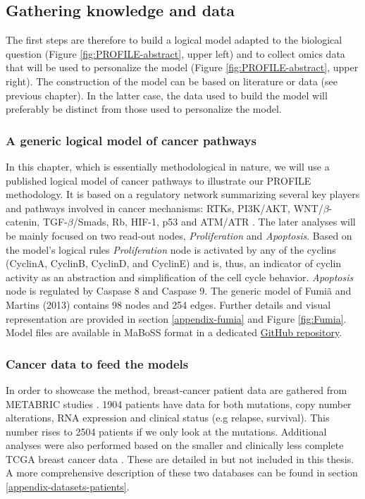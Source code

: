 \documentclass[a4paper,12pt,twoside,onecolumn,openright,final,oldfontcommands]{memoir}
\begin{document}
\subsection{Gathering knowledge and
data}\label{gathering-knowledge-and-data}

The first steps are therefore to build a logical model adapted to the
biological question (Figure \ref{fig:PROFILE-abstract}, upper left) and
to collect omics data that will be used to personalize the model (Figure
\ref{fig:PROFILE-abstract}, upper right). The construction of the model
can be based on literature or data (see previous chapter). In the latter
case, the data used to build the model will preferably be distinct from
those used to personalize the model.

\subsubsection{A generic logical model of cancer
pathways}\label{a-generic-logical-model-of-cancer-pathways}

In this chapter, which is essentially methodological in nature, we will
use a published logical model of cancer pathways to illustrate our
PROFILE methodology. It is based on a regulatory network summarizing
several key players and pathways involved in cancer mechanisms: RTKs,
PI3K/AKT, WNT/\(\beta\)-catenin, TGF-\(\beta\)/Smads, Rb, HIF-1, p53 and
ATM/ATR \citep{fumia2013boolean}. The later analyses will be mainly
focused on two read-out nodes, \emph{Proliferation} and
\emph{Apoptosis}. Based on the model's logical rules
\emph{Proliferation} node is activated by any of the cyclins (CyclinA,
CyclinB, CyclinD, and CyclinE) and is, thus, an indicator of cyclin
activity as an abstraction and simplification of the cell cycle
behavior. \emph{Apoptosis} node is regulated by Caspase 8 and Caspase 9.
The generic model of Fumiã and Martins (2013) contains 98 nodes and 254
edges. Further details and visual representation are provided in section
\ref{appendix-fumia} and Figure \ref{fig:Fumia}. Model files are
available in MaBoSS format in a dedicated
\href{https://github.com/sysbio-curie/PROFILE/tree/master/Models/Fumia2013}{GitHub
repository}.

\subsubsection{Cancer data to feed the
models}\label{cancer-data-to-feed-the-models}

In order to showcase the method, breast-cancer patient data are gathered
from METABRIC studies \citep{curtis2012genomic, pereira2016somatic}.
1904 patients have data for both mutations, copy number alterations, RNA
expression and clinical status (e.g relapse, survival). This number
rises to 2504 patients if we only look at the mutations. Additional
analyses were also performed based on the smaller and clinically less
complete TCGA breast cancer data \citep{cancer2012comprehensive}. These
are detailed in \citet{beal2019personalization} but not included in this
thesis. A more comprehensive description of these two databases can be
found in section \ref{appendix-datasets-patients}.
\end{document}
